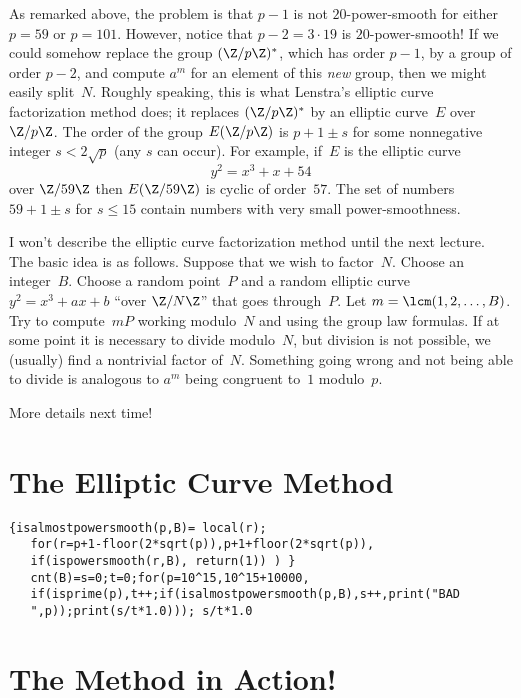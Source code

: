 \documentclass[11pt]{report}
\begin{document}
As remarked above, the problem is that $p-1$ is not $20$-power-smooth for
either $p=59$ or $p=101$.  However, notice that $p-2=3\cdot 19$ is
$20$-power-smooth!  If we could somehow
replace the group $(\Z/p\Z)^*$, which has order $p-1$, by a group
of order $p-2$, and compute $a^m$ for an element of this {\em new}
group, then we might easily split~$N$.  Roughly speaking, this is
what Lenstra's elliptic curve factorization method does; it
replaces $(\Z/p\Z)^*$ by an elliptic curve~$E$ over $\Z/p\Z$.
The order of the group $E(\Z/p\Z)$ is $p+1\pm s$ for some
nonnegative integer $s<2\sqrt{p}$ (any $s$ can occur).
For example, if~$E$ is the elliptic curve
$$
  y^2 = x^3 + x + 54
$$
over $\Z/59\Z$ then $E(\Z/59\Z)$ is cyclic of order~$57$.
The set of numbers $59+1\pm s$ for $s\leq 15$ contain
numbers with very small power-smoothness.

I won't describe the elliptic curve factorization method until the
next lecture.  The basic idea is as follows.  Suppose that we wish to
factor~$N$.  Choose an integer~$B$.  Choose a random point~$P$ and a
random elliptic curve $y^2=x^3+ax+b$ ``over $\Z/N\Z$'' that goes
through~$P$.  Let $m=\lcm(1,2,\ldots,B)$.  Try to compute~$mP$ working
modulo~$N$ and using the group law formulas.  If at some
point it is necessary to divide modulo~$N$, but division is not
possible, we (usually) find a nontrivial factor of~$N$.  Something
going wrong and not being able to divide is analogous to $a^m$ being
congruent to~$1$ modulo~$p$.

More details next time!



\section{The Elliptic Curve Method}
\begin{verbatim}
{isalmostpowersmooth(p,B)= local(r);
   for(r=p+1-floor(2*sqrt(p)),p+1+floor(2*sqrt(p)),
   if(ispowersmooth(r,B), return(1)) ) }
   cnt(B)=s=0;t=0;for(p=10^15,10^15+10000,
   if(isprime(p),t++;if(isalmostpowersmooth(p,B),s++,print("BAD
   ",p));print(s/t*1.0))); s/t*1.0
\end{verbatim}

\section{The Method in Action!}




\end{document}
